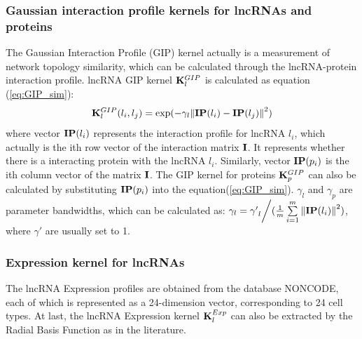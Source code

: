 \documentclass[fleqn,10pt]{wlscirep}
\begin{document}
\subsubsection*{Gaussian interaction profile kernels for lncRNAs and proteins}
The Gaussian Interaction Profile (GIP) kernel actually is a measurement of network topology similarity\cite{VanLaarhoven2011}, which can be calculated through the lncRNA-protein interaction profile. lncRNA GIP kernel ${\bf{K}}_l^{GIP}$ is calculated as equation (\ref{eq:GIP_sim}):
\begin{equation} \label{eq:GIP_sim}
{\bf{K}}_l^{GIP}({l_i},{l_j}) = \exp ( - {\gamma _l}{\left\| {{\bf{IP}}({l_i}) - {\bf{IP}}({l_j})} \right\|^2})
\end{equation}
where vector ${{\bf{IP}}({l_i})}$ represents the interaction profile for lncRNA $l_i$, which actually is the ith row vector of the interaction matrix ${\bf{I}}$. It represents whether there is a interacting protein with the lncRNA $l_i$. Similarly, vector ${{\bf{IP}}({p_i})}$ is the ith column vector of the matrix ${\bf{I}}$. The GIP kernel for proteins ${\bf{K}}_p^{GIP}$ can also be calculated by substituting ${{\bf{IP}}({p_i})}$ into the equation(\ref{eq:GIP_sim}).
   ${\gamma _l}$ and ${\gamma _p}$ are parameter bandwidths, which can be calculated as: ${\gamma _l} = {{{{\gamma '}_l}} \mathord{\left/
 {\vphantom {{{{\gamma '}_l}} {(\frac{1}{m}\sum\limits_{i = 1}^m {{{\left\| {{\bf{IP}}({l_i})} \right\|}^2}} )}}} \right.
 \kern-\nulldelimiterspace} {(\frac{1}{m}\sum\limits_{i = 1}^m {{{\left\| {{\bf{IP}}({l_i})} \right\|}^2}} )}}$, where ${\gamma '}$ are usually set to 1.

\subsubsection*{Expression kernel for lncRNAs}
The lncRNA Expression profiles are obtained from the database NONCODE, each of which is represented as a 24-dimension vector, corresponding to 24 cell types. At last, the lncRNA Expression kernel ${\bf{K}}_l^{Exp}$ can also be extracted by the Radial Basis Function as in the literature\cite{Buhmann2004}.
\end{document}
